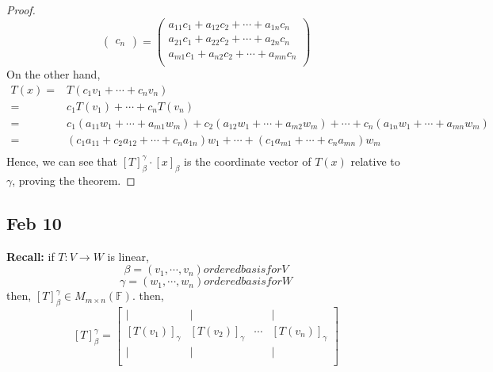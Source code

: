\documentclass[12pt]{article}
\theoremstyle{plain}
\newcommand{\mF}{{\mathbb{F}}}
\begin{document}
\begin{proof}
\[\begin{pmatrix}
				c_n
			\end{pmatrix}
			=
			\begin{pmatrix}
				a_{11}c_1 + a_{12}c_2 + \cdots + a_{1n}c_n\\
				a_{21}c_1 + a_{22}c_2 + \cdots + a_{2n}c_n\\
				a_{m1}c_1 + a_{n2}c_2 + \cdots + a_{mn}c_n\\
			\end{pmatrix}
		\]
		On the other hand, 
		\begin{align*}
			T(x) 
			=& T(c_1v_1 + \cdots + c_nv_n)\\
			=& c_1T(v_1) + \cdots + c_nT(v_n)\\
			=& c_1(a_{11}w_1+\cdots + a_{m1}w_m) + c_2(a_{12}w_1+\cdots
			+a_{m2}w_m) + \cdots + c_n(a_{1n}w_1+ \cdots + a_{mn}w_m)\\
			=& (c_1a_{11} + c_2a_{12} + \cdots + c_na_{1n})
			w_1 + \cdots + (c_1a_{m1}+\cdots +c_na_{mn})w_m\\
		\end{align*}
		Hence, we can see that $[T]_{\beta}^{\gamma} \cdot [x]_{\beta}$ is the
		coordinate vector of $T(x)$ relative to $\gamma$, proving the theorem.
	\end{proof}
	

	

	\newpage
	\subsection{Feb 10}

	\textbf{Recall: }if $T:V\to W$ is linear, 
	\[
		\beta = (v_1,\cdots, v_n) ordered basis for V
	\]
	\[
		\gamma = (w_1,\cdots, w_n) ordered basis for W
	\]
	then, $[T]_{\beta}^{\gamma} \in M_{m\times n} (\mF)$. then, 
	\[
			[T]^{\gamma}_{\beta} = 
			\begin{bmatrix}
				| & | &  & | \\
				[T(v_1)]_{\gamma} & [T(v_2)]_{\gamma} & \cdots 
								  & [T(v_n)]_{\gamma}\\
				| & | & & | \\
			\end{bmatrix}
	\]\\
\end{document}
